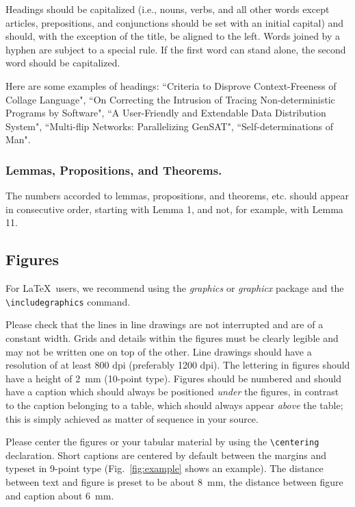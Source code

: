\documentclass[runningheads,a4paper]{llncs}
\begin{document}
Headings should be capitalized
(i.e., nouns, verbs, and all other words
except articles, prepositions, and conjunctions should be set with an
initial capital) and should,
with the exception of the title, be aligned to the left.
Words joined by a hyphen are subject to a special rule. If the first
word can stand alone, the second word should be capitalized.

Here are some examples of headings: ``Criteria to Disprove
Context-Freeness of Collage Language", ``On Correcting the Intrusion of
Tracing Non-deterministic Programs by Software", ``A User-Friendly and
Extendable Data Distribution System", ``Multi-flip Networks:
Parallelizing GenSAT", ``Self-determinations of Man".

\subsubsection{Lemmas, Propositions, and Theorems.}

The numbers accorded to lemmas, propositions, and theorems, etc. should
appear in consecutive order, starting with Lemma 1, and not, for
example, with Lemma 11.

\subsection{Figures}

For \LaTeX\ users, we recommend using the \emph{graphics} or \emph{graphicx}
package and the \verb+\includegraphics+ command.

Please check that the lines in line drawings are not
interrupted and are of a constant width. Grids and details within the
figures must be clearly legible and may not be written one on top of
the other. Line drawings should have a resolution of at least 800 dpi
(preferably 1200 dpi). The lettering in figures should have a height of
2~mm (10-point type). Figures should be numbered and should have a
caption which should always be positioned \emph{under} the figures, in
contrast to the caption belonging to a table, which should always appear
\emph{above} the table; this is simply achieved as matter of sequence in
your source.

Please center the figures or your tabular material by using the \verb+\centering+
declaration. Short captions are centered by default between the margins
and typeset in 9-point type (Fig.~\ref{fig:example} shows an example).
The distance between text and figure is preset to be about 8~mm, the
distance between figure and caption about 6~mm.
\end{document}
